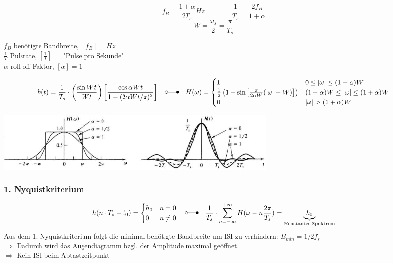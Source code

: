 \begin{minipage}{9cm}
$$ f_B = \frac{1 + \alpha}{2 T_s} Hz \qquad \qquad \frac{1}{T_s} = \frac{2 f_B}{1 + \alpha}$$
$$ W = \frac{\omega_s}{2} = \frac{\pi}{T_s}$$
\end{minipage}
\begin{minipage}{9cm}
	$f_B$ benötigte Bandbreite, $[f_B] = Hz$ \\
	$\frac{1}{T}$ Pulsrate, $[\frac{1}{T}] = $ "Pulse pro Sekunde" \\
	$\alpha$ roll-off-Faktor, $[\alpha] = 1$ 
\end{minipage}
 
\[h(t) = \frac{1}{T_s} \cdot \left( \frac{\sin{W t}}{W t} \right) \left[ \frac{\cos{\alpha W t}}{1
- (2 \alpha W t / \pi)^2}\right]
\quad \laplace \quad
H(\omega) = \begin{cases}
	1 			
		&  	0 \leq | \omega | \leq (1-\alpha) W       \\
	\frac{1}{2} \left( 1 - \sin\left[ \frac{\pi}{2 \alpha W} (| \omega | - W)\right] \right)      
		&	(1-\alpha) W \leq | \omega | \leq (1+\alpha) W       \\
	0
		& 	| \omega | > (1+\alpha) W
            \end{cases}\]


\begin{center}  
		\includegraphics[height=3cm]{bilder/dig_raisedcosinefilter.png}
\end{center}

\subsubsection{1. Nyquistkriterium}
	\[h(n\cdot T_s-t_0) = 
		\begin{cases}
			h_0 & n= 0\\
			0 & n \neq 0
		\end{cases}
		\quad \laplace \quad
		\frac{1}{T_s} \cdot \sum\limits_{n = -\infty}^{+ \infty} H(\omega - n\frac{2\pi}{T_s}) = \underbrace{h_0}_{\text{Konstantes Spektrum}}
		\]
	Aus dem 1. Nyquistkriterium folgt die minimal benötigte Bandbreite um ISI zu verhindern: $B_{min} = 1/2 f_s$\\
	$\Rightarrow$ Dadurch wird das Augendiagramm bzgl. der Amplitude maximal geöffnet. \\
	$\Rightarrow$ Kein ISI beim Abtastzeitpunkt
	
